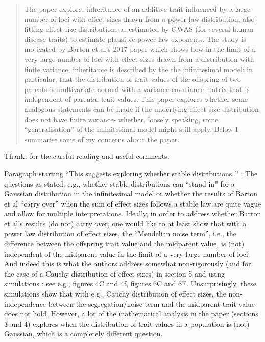 
\begin{quote}
The paper explores inheritance of an additive trait influenced by a large number of loci with effect sizes drawn from a power law distribution, also fitting effect size distributions as estimated by GWAS (for several human disease traits) to estimate plausible power law exponents. The study is motivated by Barton et al's 2017 paper which shows how in the limit of a very large number of loci with effect sizes drawn from a distribution with finite variance, inheritance is described by the the infinitesimal model: in particular, that the distribution of trait values of the offspring of two parents is multivariate normal with a variance-covariance matrix that is independent of parental trait values. This paper explores whether some analogous statements can be made if the underlying effect size distribution does not have finite variance- whether, loosely speaking, some ``generalisation'' of the infinitesimal model might still apply. Below I summarise some of my concerns about the paper.
\end{quote}

Thanks for the careful reading and useful comments.

\begin{point}{}
    Paragraph starting ``This suggests exploring whether stable distributions..'' \revref:
The questions as stated: e.g., whether stable distributions can ``stand in'' for a Gaussian distribution in the infinitesimal model or whether the results of Barton et al ``carry over'' when the sum of effect sizes follows a stable law are quite vague and allow for multiple interpretations. Ideally, in order to address whether Barton et al's results (do not) carry over, one would like to at least show that with a power law distribution of effect sizes, the ``Mendelian noise term'', i.e., the difference between the offspring trait value and the midparent value, is (not) independent of the midparent value in the limit of a very large number of loci. And indeed this is what the authors address
somewhat non-rigorously (and for the case of a Cauchy distribution of effect sizes) in section 5 and using simulations : see e.g., figures 4C and 4f, figures 6C and 6F. Unsurprisingly, these simulations show that with e.g., Cauchy distribution of effect sizes, the non-independence between the segregation/noise term and the midparent trait value does not hold. However, a lot of the mathematical analysis in the paper (sections 3 and 4) explores when the distribution of trait values in a population is (not) Gaussian, which is a completely different question.
\end{point}

